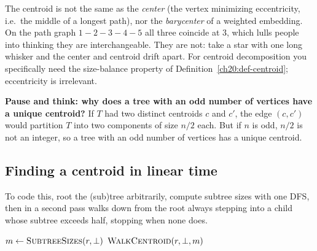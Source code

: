 \begin{trapbox}
The centroid is not the same as the \emph{center} (the vertex minimizing
eccentricity, i.e.\ the middle of a longest path), nor the \emph{barycenter} of a
weighted embedding. On the path graph $1\!-\!2\!-\!3\!-\!4\!-\!5$ all three
coincide at $3$, which lulls people into thinking they are interchangeable. They
are not: take a star with one long whisker and the center and centroid drift apart.
For centroid decomposition you specifically need the size-balance property of
Definition~\ref{ch20:def-centroid}; eccentricity is irrelevant.
\end{trapbox}

\begin{recoverybox}
\textbf{Pause and think: why does a tree with an odd number of vertices have a unique centroid?}
If $T$ had two distinct centroids $c$ and $c'$, the edge $(c, c')$ would partition $T$ into two components of size $n/2$ each. But if $n$ is odd, $n/2$ is not an integer, so a tree with an odd number of vertices has a unique centroid.
\end{recoverybox}

\subsection{Finding a centroid in linear time}

To code this, root the (sub)tree arbitrarily, compute
subtree sizes with one DFS, then in a second pass walks down from the root always
stepping into a child whose subtree exceeds half, stopping when none does.

\begin{algorithm}[H]
\caption{Find the centroid of a tree (or subtree) of size $m$}
\label{ch20:alg-find}
\DontPrintSemicolon
{}
$m\gets\textsc{SubtreeSizes}(r,\bot)$\;
\Return $\textsc{WalkCentroid}(r,\bot,m)$\;
\end{algorithm}

